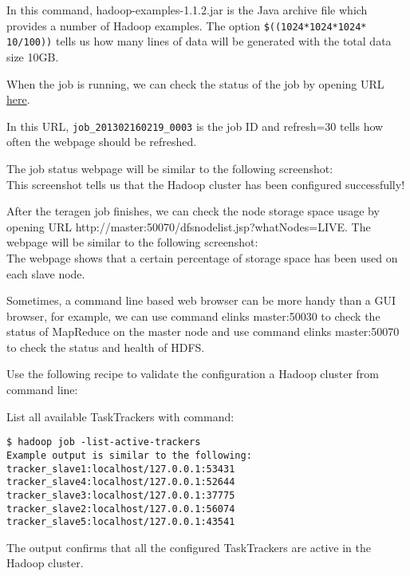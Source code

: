 In this command, hadoop-examples-1.1.2.jar is the Java archive file which provides a number of Hadoop examples. The option \verb|$((1024*1024*1024* 10/100))| tells us how many lines of data will be generated with the total data size 10GB.

When the job is running, we can check the status of the job by opening URL \href{http://master:50030/jobdetails.jsp?jobid=job_201302160219_0003&refresh=30}{here}.

In this URL, \verb|job_201302160219_0003| is the job ID and refresh=30 tells how often the webpage should be refreshed.

The job status webpage will be similar to the following screenshot: \\


This screenshot tells us that the Hadoop cluster has been configured successfully!

After the teragen job finishes, we can check the node storage space usage by opening URL http://master:50070/dfsnodelist.jsp?whatNodes=LIVE. The webpage will be similar to the following screenshot: \\

The webpage shows that a certain percentage of storage space has been used on each slave node.

Sometimes, a command line based web browser can be more handy than a GUI browser, for example, we can use command elinks master:50030 to check the status of MapReduce on the master node and use command  elinks master:50070 to check the status and health of HDFS.

Use the following recipe to validate the configuration a Hadoop cluster from command line:

List all available TaskTrackers with command:
\begin{verbatim}
$ hadoop job -list-active-trackers
Example output is similar to the following:
tracker_slave1:localhost/127.0.0.1:53431
tracker_slave4:localhost/127.0.0.1:52644
tracker_slave3:localhost/127.0.0.1:37775
tracker_slave2:localhost/127.0.0.1:56074
tracker_slave5:localhost/127.0.0.1:43541
\end{verbatim}

The output confirms that all the configured TaskTrackers are active in the Hadoop cluster.

